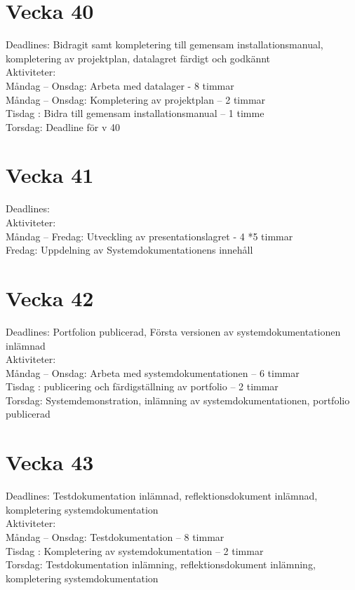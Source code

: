 \documentclass{TDP003mall}
\begin{document}
\section*{Vecka 40}

Deadlines: Bidragit samt kompletering till gemensam installationsmanual, kompletering av projektplan, datalagret färdigt och godkännt\\

Aktiviteter: \\
Måndag – Onsdag: Arbeta med datalager - 8 timmar\\
Måndag – Onsdag: Kompletering av projektplan – 2 timmar\\
Tisdag : Bidra till gemensam installationsmanual – 1 timme\\
{\color{red}Torsdag:} Deadline för v 40\\

\section*{Vecka 41}
Deadlines: \\

Aktiviteter: \\
Måndag – Fredag: Utveckling av presentationslagret - 4 *5 timmar\\
Fredag: Uppdelning av Systemdokumentationens innehåll\\

\section*{Vecka 42}

Deadlines: Portfolion publicerad, Första versionen av systemdokumentationen inlämnad \\

Aktiviteter: \\
Måndag – Onsdag: Arbeta med systemdokumentationen – 6 timmar\\
Tisdag : publicering och färdigställning av portfolio – 2 timmar\\
{\color{red}Torsdag:} Systemdemonstration, inlämning av systemdokumentationen, portfolio publicerad\\

\section*{Vecka 43}

Deadlines: Testdokumentation inlämnad, reflektionsdokument inlämnad, kompletering systemdokumentation\\

Aktiviteter: \\
Måndag – Onsdag: Testdokumentation – 8 timmar\\
Tisdag : Kompletering av systemdokumentation  – 2 timmar\\
{\color{red}Torsdag:} Testdokumentation inlämning, reflektionsdokument inlämning, kompletering systemdokumentation\\
\end{document}
